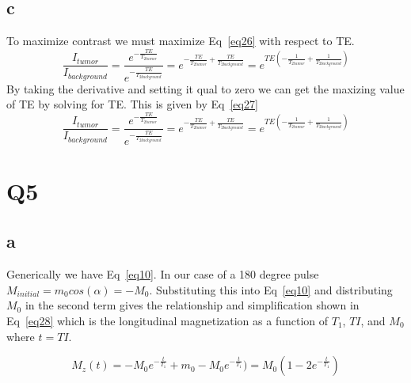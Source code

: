 \documentclass[12pt]{article}
\begin{document}
\subsection{c}
To maximize contrast we must maximize Eq~\ref{eq26} with respect to TE.
\begin{equation}
\frac{I_{tumor}}{I_{background}} = \frac{e^{-\frac{TE}{T_{2tumor}}}}{e^{-\frac{TE}{T_{2background}}}} = e^{-\frac{TE}{T_{2tumor}} + \frac{TE}{T_{2background}}} = e^{TE(-\frac{1}{T_{2tumor}} + \frac{1}{T_{2background}})}
\label{eq26}
\end{equation}
By taking the derivative and setting it qual to zero we can get the maxizing value of TE by solving for TE. This is given by Eq~\ref{eq27}
\begin{equation}
\frac{I_{tumor}}{I_{background}} = \frac{e^{-\frac{TE}{T_{2tumor}}}}{e^{-\frac{TE}{T_{2background}}}} = e^{-\frac{TE}{T_{2tumor}} + \frac{TE}{T_{2background}}} = e^{TE(-\frac{1}{T_{2tumor}} + \frac{1}{T_{2background}})}
\label{eq27}
\end{equation}


\section{Q5}
\subsection{a}
Generically we have Eq~\ref{eq10}. In our case of a 180 degree pulse $M_{initial} = m_0cos(\alpha) = -M_0$. Substituting this into Eq~\ref{eq10} and distributing $M_0$ in the second term gives the relationship and simplification shown in Eq~\ref{eq28} which is the longitudinal magnetization as a function of $T_1$, $TI$, and $M_0$ where $t = TI$.

\begin{equation}
M_z(t) = -M_0  e^{-\frac{t}{T_1}} + m_0-M_0e^{-\frac{t}{T_1}}) = M_0(1-2e^{-\frac{t}{T_1}})
\label{eq28}
\end{equation}
\end{document}
